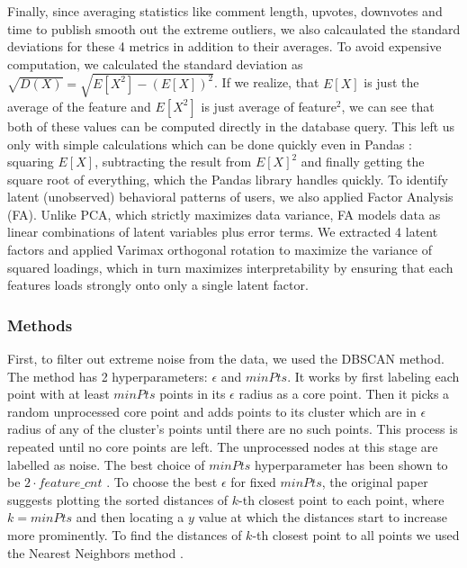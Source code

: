 \documentclass[11pt,a4paper]{article}
\begin{document}
Finally, since averaging statistics like comment length, upvotes, downvotes and time to publish smooth out the extreme outliers, we also calcaulated the standard deviations for these 4 metrics in addition to their averages. To avoid expensive computation, we calculated the standard deviation as $\sqrt{D(X)} = \sqrt{E[X^2] - (E[X])^2}$. If we realize, that $E[X]$ is just the average of the feature and $E[X^2]$ is just average of feature$^2$, we can see that both of these values can be computed directly in the database query. This left us only with simple calculations which can be done quickly even in Pandas \cite{Reback2020} \cite{McKinney2010}: squaring $E[X]$, subtracting the result from $E[X]^2$ and finally getting the square root of everything, which the Pandas library handles quickly. To identify latent (unobserved) behavioral patterns of users, we also applied Factor Analysis \cite{Spearman1904} (FA). Unlike PCA, which strictly maximizes data variance, FA models data as linear combinations of latent variables plus error terms. We extracted 4 latent factors and applied Varimax orthogonal rotation to maximize the variance of squared loadings, which in turn maximizes interpretability by ensuring that each features loads strongly onto only a single latent factor.

\subsubsection{Methods}
First, to filter out extreme noise from the data, we used the DBSCAN \cite{Ester1996} method. The method has 2 hyperparameters: $\epsilon$ and $minPts$. It works by first labeling each point with at least $minPts$ points in its $\epsilon$ radius as a core point. Then it picks a random unprocessed core point and adds points to its cluster which are in $\epsilon$ radius of any of the cluster's points until there are no such points. This process is repeated until no core points are left. The unprocessed nodes at this stage are labelled as noise. The best choice of $minPts$ hyperparameter has been shown to be $2\cdot feature\_cnt$ \cite{Sander1998}. To choose the best $\epsilon$ for fixed $minPts$, the original paper \cite{Ester1996} suggests plotting the sorted distances of $k$-th closest point to each point, where $k = minPts$ and then locating a $y$ value at which the distances start to increase more prominently. To find the distances of $k$-th closest point to all points we used the Nearest Neighbors method \cite{Fix1985}.
\end{document}
